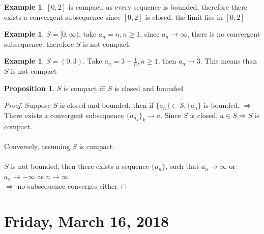 \documentclass[12pt]{article}
\theoremstyle{plain}
\theoremstyle{definition}
\newtheorem{example}[theorem]{Example}
\newtheorem{proposition}[theorem]{Proposition}
\begin{document}
\begin{example}
	$[0,2]$ is compact, as every sequence is bounded, therefore there exists a convergent subsequence since $[0,2]$ is closed, the limit lies in $[0,2]$
\end{example}

\begin{example}
	$S=[0,\infty)$, take $a_n = n, n\geq 1$, since $a_n \to \infty$, there is no convergent subsequence, therefore $S$ is not compact.
\end{example}

\begin{example}
	$S=(0,3)$. Take $a_n = 3 - \frac{1}{n}, n\geq 1$, then $a_n \to 3$. This means than $S$ is not compact
\end{example}

\begin{proposition}
	$S$ is compact iff $S$ is closed and bounded
\end{proposition}

\begin{proof}
	Suppose $S$ is closed and bounded, then if $\{ a_n \} \subset S, \{ a_n \}$ is bounded. $\Longrightarrow$ There exists a convergent subsequence $\{ a_{n_k} \}_k \to a$. Since $S$ is closed, $a \in S \Longrightarrow S$ is compact.\\
	\\
	Conversely, assuming $S$ is compact.\\
	\\
	$S$ is not bounded, then there exists a sequence $\{ a_n \}$, such that $a_n \to \infty$ or $a_n \to -\infty$ as $n \to \infty$\\
	$\Longrightarrow$ no subsequence converges either
\end{proof}






\newpage
\section{Friday, March 16, 2018}
\end{document}
